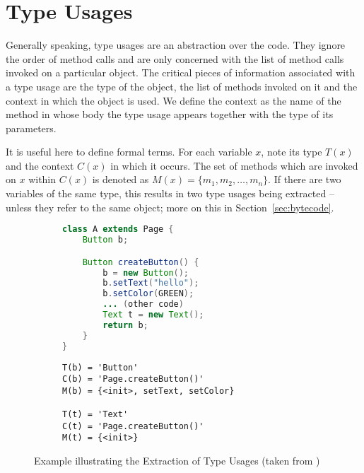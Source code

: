 \section{Type Usages}

Generally speaking, type usages are an abstraction over the code.
They ignore the order of method calls and are only concerned with the list of method calls invoked on a particular object.
The critical pieces of information associated with a type usage are the type of the object, the list of methods invoked on it and the context in which the object is used.
We define the context as the name of the method in whose body the type usage appears together with the type of its parameters.

It is useful here to define formal terms.
For each variable $x$, note its type $T(x)$ and the context $C(x)$ in which it occurs.
The set of methods which are invoked on $x$ within $C(x)$ is denoted as $M(x) =\{ m_1, m_2, \dotsc, m_n\}$.
If there are two variables of the same type, this results in two type usages being extracted -- unless they refer to the same object; more on this in Section~\ref{sec:bytecode}.

\begin{figure}[h]
    \begin{subfigure}[c]{0.5\textwidth}
        \begin{lstlisting}[language=java, basicstyle=\small]
class A extends Page {
    Button b;

    Button createButton() {
        b = new Button();
        b.setText("hello");
        b.setColor(GREEN);
        ... (other code)
        Text t = new Text();
        return b;
    }
}
        \end{lstlisting}
    \end{subfigure}
    \begin{subfigure}[c]{0.5\textwidth}
        \begin{lstlisting}[basicstyle=\small]
T(b) = 'Button'
C(b) = 'Page.createButton()'
M(b) = {<init>, setText, setColor}

T(t) = 'Text'
C(t) = 'Page.createButton()'
M(t) = {<init>}
        \end{lstlisting}
    \end{subfigure}
    \caption{Example illustrating the Extraction of Type Usages (taken from \cite{monperrus2013detecting})}
    \label{fig:tu_example}
\end{figure}

